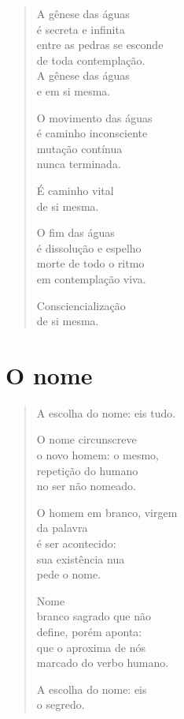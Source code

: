 \begin{verse}
A gênese das águas\\
é secreta e infinita\\
entre as pedras se esconde\\
de toda contemplação.\\
A gênese das águas\\
e em si mesma.

\dotfill

O movimento das águas\\
é caminho inconsciente\\
mutação contínua\\
nunca terminada.

É caminho vital\\
de si mesma.

\dotfill

O fim das águas\\
é dissolução e espelho\\
morte de todo o ritmo\\
em contemplação viva.

Consciencialização\\
de si mesma.
\end{verse}

\chapter{O nome}

\begin{verse}
A escolha do nome: eis tudo.

O nome circunscreve\\
o novo homem: o mesmo,\\
repetição do humano\\
no ser não nomeado.

O homem em branco, virgem\\
da palavra\\
é ser acontecido:\\
sua existência nua\\
pede o nome.

Nome\\
branco sagrado que não\\
define, porém aponta:\\
que o aproxima de nós\\
marcado do verbo humano.

A escolha do nome: eis\\
o segredo.
\end{verse}

